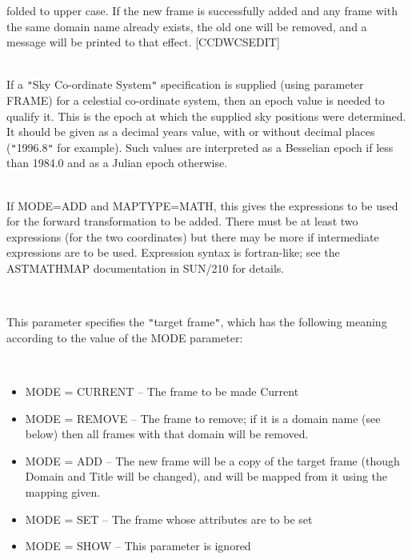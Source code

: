 \documentclass[twoside,11pt]{article}
\renewcommand{\_}{\texttt{\symbol{95}}}
\newcommand{\qt}[1]{{\tt "}#1{\tt "}}
\newcommand{\sstsubsection}[1]{ \item[{#1}] \mbox{} \\}
\newcommand{\sstitemlist}[1]{
  \mbox{} \\
  \vspace{-3.5ex}
  \begin{itemize}
     #1
  \end{itemize}
}
\newcommand{\sstitem}{\item}
\newcommand{\sstsubsection}[1]{\item[{#1}]}
\newcommand{\sstitemlist}[1]{
      \begin{itemize}
         #1
      \end{itemize}
      \\
   }
\newcommand{\sstitem}{\item}
\begin{document}
{{{         folded to upper case.  If the new frame is successfully added
         and any frame with the same domain name already exists, the
         old one will be removed, and a message will be printed to that
         effect.
         [CCD\_WCSEDIT]
      }
      \sstsubsection{
         EPOCH = \_DOUBLE (Read)
      } {
         If a \qt{Sky Co-ordinate System} specification is supplied (using
         parameter FRAME) for a celestial co-ordinate system, then
         an epoch value is needed to qualify it. This is the epoch at
         which the supplied sky positions were determined. It should be
         given as a decimal years value, with or without decimal places
         (\qt{1996.8} for example). Such values are interpreted as a
         Besselian epoch if less than 1984.0 and as a Julian epoch
         otherwise.
      }
      \sstsubsection{
         FOREXP $*$ ( $*$ ) = LITERAL (Read)
      }{
         If MODE=ADD and MAPTYPE=MATH, this gives the expressions to
         be used for the forward transformation to be added.  There
         must be at least two expressions (for the two coordinates)
         but there may be more if intermediate expressions are to
         be used.  Expression syntax is fortran-like; see the
         AST\_MATHMAP documentation in SUN/210 for details.
      }
      \sstsubsection{
         FRAME = LITERAL (Read)
      } {
         This parameter specifies the \qt{target frame}, which has the
         following meaning according to the value of the MODE parameter:
         \sstitemlist{
            \sstitem
               MODE = CURRENT -- The frame to be made Current
            \sstitem
               MODE = REMOVE  -- The frame to remove; if it is a domain
                                 name (see below) then all frames with
                                 that domain will be removed.
            \sstitem
                MODE = ADD    -- The new frame will be a copy of the
                                 target frame (though Domain and Title
                                 will be changed), and will be mapped 
                                 from it using the mapping given.
            \sstitem
               MODE = SET     -- The frame whose attributes are to be set
            \sstitem
               MODE = SHOW    -- This parameter is ignored
         }

}}}
\end{document}

